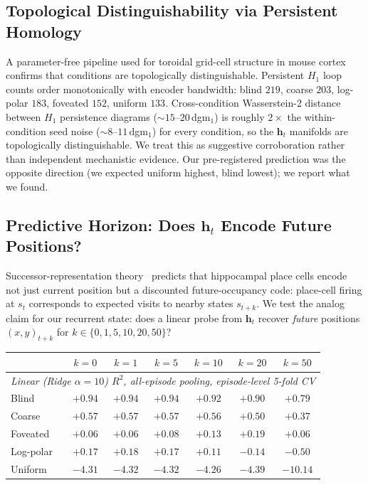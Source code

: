 \documentclass{article}
\newcommand{\uncertain}[1]{#1}
\begin{document}
\subsection{Topological Distinguishability via Persistent Homology}
\label{app:topology}

A parameter-free pipeline used for toroidal grid-cell structure in mouse cortex~\citep{gardner2022toroidal} confirms that conditions are topologically distinguishable. Persistent $H_1$ loop counts order monotonically with encoder bandwidth: blind $219$, coarse $203$, log-polar $183$, foveated $152$, uniform $133$. Cross-condition Wasserstein-2 distance between $H_1$ persistence diagrams ($\sim 15$--$20$\,dgm$_1$) is roughly $2{\times}$ the within-condition seed noise ($\sim 8$--$11$\,dgm$_1$) for every condition, so the $\mathbf{h}_t$ manifolds are topologically distinguishable. We treat this as suggestive corroboration rather than independent mechanistic evidence. \uncertain{Our pre-registered prediction was the opposite direction (we expected uniform highest, blind lowest); we report what we found.}

\subsection{Predictive Horizon: Does $\mathbf{h}_t$ Encode Future Positions?}
\label{app:predictive_horizon}

Successor-representation theory~\citep{stachenfeld2017predictive,whittington2020tem} predicts that hippocampal place cells encode not just current position but a discounted future-occupancy code: place-cell firing at $s_t$ corresponds to expected visits to nearby states $s_{t+k}$. We test the analog claim for our recurrent state: does a linear probe from $\mathbf{h}_t$ recover \emph{future} positions $(x, y)_{t+k}$ for $k \in \{0, 1, 5, 10, 20, 50\}$?

\begin{center}
\begin{tabular}{l|cccccc}
\toprule
 & $k=0$ & $k=1$ & $k=5$ & $k=10$ & $k=20$ & $k=50$ \\
\midrule
\multicolumn{7}{l}{\emph{Linear (Ridge $\alpha = 10$) $R^2$, all-episode pooling, episode-level 5-fold CV}} \\
Blind             & $+0.94$ & $+0.94$ & $+0.94$ & $+0.92$ & $+0.90$ & $+0.79$ \\
Coarse            & $+0.57$ & $+0.57$ & $+0.57$ & $+0.56$ & $+0.50$ & $+0.37$ \\
Foveated          & $+0.06$ & $+0.06$ & $+0.08$ & $+0.13$ & $+0.19$ & $+0.06$ \\
Log-polar & $+0.17$ & $+0.18$ & $+0.17$ & $+0.11$ & $-0.14$ & $-0.50$ \\
Uniform           & $-4.31$ & $-4.32$ & $-4.32$ & $-4.26$ & $-4.39$ & $-10.14$ \\
\bottomrule
\end{tabular}
\end{center}
\end{document}
